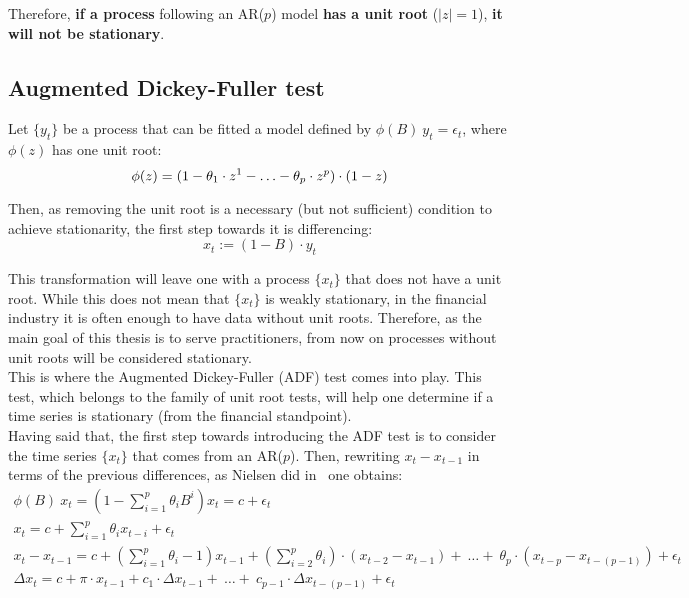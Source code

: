\documentclass[a4paper]{report}
\begin{document}
Therefore, \textbf{if a process} following an AR($p$) model \textbf{has a 
unit root} ($|z| = 1$), \textbf{it will not be stationary}.

\subsection{Augmented Dickey-Fuller test}
Let $\{ y_t \}$ be a process that can be fitted a model defined by $\phi(B) 
\ y_t = \epsilon_t$, where $\phi(z)$ has one unit root:
\begin{equation*}
	\phi(z) = (1 - \theta_1 \cdot z^1 - \ldots - \theta_p \cdot z^p) 
	\cdot (1 - z)\\
\end{equation*}

Then, as removing the unit root is a necessary (but not sufficient) condition 
to achieve stationarity, the first step towards it is differencing:
\begin{equation*}
	x_t := (1-B) \cdot y_t
\end{equation*}

This transformation will leave one with a process $\{ x_t \}$ that does not 
have a unit root. While this does not mean that $\{ x_t \}$ is weakly 
stationary, in the financial industry it is often enough to have data 
without unit roots. Therefore, as the main goal of this thesis is to serve 
practitioners, from now on processes without unit roots will be considered 
stationary.\\

This is where the Augmented Dickey-Fuller (ADF) test comes into play. This 
test, which belongs to the family of unit root tests, will help one determine 
if a time series is stationary (from the financial standpoint).\\

Having said that, the first step towards introducing the ADF test is to 
consider the time series $\{ x_t \}$ that comes from an AR($p$). Then, 
rewriting $x_t - x_{t-1}$ in terms of the previous differences, as Nielsen 
did in~\cite{nielsen2005non} one obtains:
\begin{align*}
	\phi(B) \ x_t = \left( 1 - \sum_{i=1}^p \theta_i B^i \right) x_t = c + 
	\epsilon_t\\
	x_t = c + \sum_{i = 1}^p \theta_i x_{t-i} + \epsilon_t\\
	x_t - x_{t-1} = c + \left(\sum_{i = 1}^p \theta_i - 1 \right)
	x_{t-1} + \left(\sum_{i = 2}^p \theta_i \right) \cdot 
	(x_{t-2} - x_{t-1}) +\ \ldots +\ \theta_p \cdot 
	(x_{t-p} - x_{t-(p-1)}) + \epsilon_t\\
	\Delta x_t = c + \pi \cdot x_{t-1} + c_1 \cdot 
	\Delta x_{t-1} +\ \ldots +\ c_{p-1} \cdot 
	\Delta x_{t-(p-1)} + \epsilon_t
\end{align*}
\end{document}
